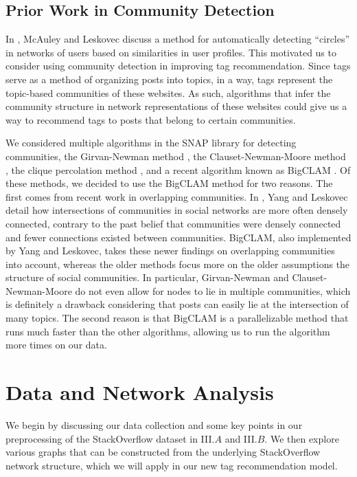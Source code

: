 \documentclass[11pt]{IEEEtran}
\begin{document}
\subsection{Prior Work in Community Detection}

In \cite{3}, McAuley and Leskovec discuss a method for automatically detecting ``circles'' in networks of users based on similarities in user profiles. This motivated us to consider using community detection in improving tag recommendation. Since tags serve as a method of organizing posts into topics, in a way, tags represent the topic-based communities of these websites. As such, algorithms that infer the community structure in network representations of these websites could give us a way to recommend tags to posts that belong to certain communities.

We considered multiple algorithms in the SNAP library for detecting communities, the Girvan-Newman method \cite{4}, the Clauset-Newman-Moore method \cite{5}, the clique percolation method \cite{6}, and a recent algorithm known as BigCLAM \cite{7}. Of these methods, we decided to use the BigCLAM method for two reasons. The first comes from recent work in overlapping communities. In \cite{8}, Yang and Leskovec detail how intersections of communities in social networks are more often densely connected, contrary to the past belief that communities were densely connected and fewer connections existed between communities. BigCLAM, also implemented by Yang and Leskovec, takes these newer findings on overlapping communities into account, whereas the older methods focus more on the older assumptions the structure of social communities. In particular, Girvan-Newman and Clauset-Newman-Moore do not even allow for nodes to lie in multiple communities, which is definitely a drawback considering that posts can easily lie at the intersection of many topics. The second reason is that BigCLAM is a parallelizable method that runs much faster than the other algorithms, allowing us to run the algorithm more times on our data.


\section{Data and Network Analysis}

We begin by discussing our data collection and some key points in our preprocessing of the StackOverflow dataset in III.$A$ and III.$B$. We then explore various graphs that can be constructed from the underlying StackOverflow network structure, which we will apply in our new tag recommendation model.
\end{document}
